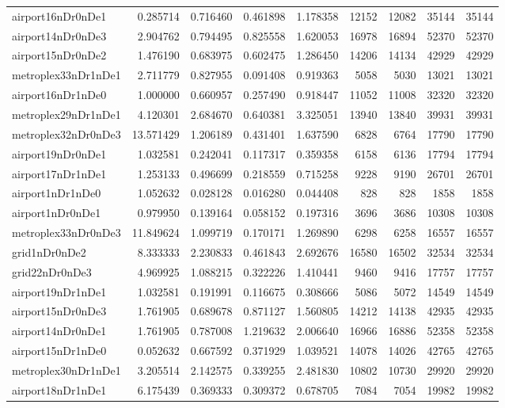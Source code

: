 \begin{longtable}{|l|r|r|r|r|r|r|r|r|}
airport16nDr0nDe1 & 0.285714 & 0.716460 & 0.461898 & 1.178358 & 12152 & 12082 & 35144 & 35144 \\
airport14nDr0nDe3 & 2.904762 & 0.794495 & 0.825558 & 1.620053 & 16978 & 16894 & 52370 & 52370 \\
airport15nDr0nDe2 & 1.476190 & 0.683975 & 0.602475 & 1.286450 & 14206 & 14134 & 42929 & 42929 \\
metroplex33nDr1nDe1 & 2.711779 & 0.827955 & 0.091408 & 0.919363 & 5058 & 5030 & 13021 & 13021 \\
airport16nDr1nDe0 & 1.000000 & 0.660957 & 0.257490 & 0.918447 & 11052 & 11008 & 32320 & 32320 \\
metroplex29nDr1nDe1 & 4.120301 & 2.684670 & 0.640381 & 3.325051 & 13940 & 13840 & 39931 & 39931 \\
metroplex32nDr0nDe3 & 13.571429 & 1.206189 & 0.431401 & 1.637590 & 6828 & 6764 & 17790 & 17790 \\
airport19nDr0nDe1 & 1.032581 & 0.242041 & 0.117317 & 0.359358 & 6158 & 6136 & 17794 & 17794 \\
airport17nDr1nDe1 & 1.253133 & 0.496699 & 0.218559 & 0.715258 & 9228 & 9190 & 26701 & 26701 \\
airport1nDr1nDe0 & 1.052632 & 0.028128 & 0.016280 & 0.044408 & 828 & 828 & 1858 & 1858 \\
airport1nDr0nDe1 & 0.979950 & 0.139164 & 0.058152 & 0.197316 & 3696 & 3686 & 10308 & 10308 \\
metroplex33nDr0nDe3 & 11.849624 & 1.099719 & 0.170171 & 1.269890 & 6298 & 6258 & 16557 & 16557 \\
grid1nDr0nDe2 & 8.333333 & 2.230833 & 0.461843 & 2.692676 & 16580 & 16502 & 32534 & 32534 \\
grid22nDr0nDe3 & 4.969925 & 1.088215 & 0.322226 & 1.410441 & 9460 & 9416 & 17757 & 17757 \\
airport19nDr1nDe1 & 1.032581 & 0.191991 & 0.116675 & 0.308666 & 5086 & 5072 & 14549 & 14549 \\
airport15nDr0nDe3 & 1.761905 & 0.689678 & 0.871127 & 1.560805 & 14212 & 14138 & 42935 & 42935 \\
airport14nDr0nDe1 & 1.761905 & 0.787008 & 1.219632 & 2.006640 & 16966 & 16886 & 52358 & 52358 \\
airport15nDr1nDe0 & 0.052632 & 0.667592 & 0.371929 & 1.039521 & 14078 & 14026 & 42765 & 42765 \\
metroplex30nDr1nDe1 & 3.205514 & 2.142575 & 0.339255 & 2.481830 & 10802 & 10730 & 29920 & 29920 \\
airport18nDr1nDe1 & 6.175439 & 0.369333 & 0.309372 & 0.678705 & 7084 & 7054 & 19982 & 19982 \\

\end{longtable}
